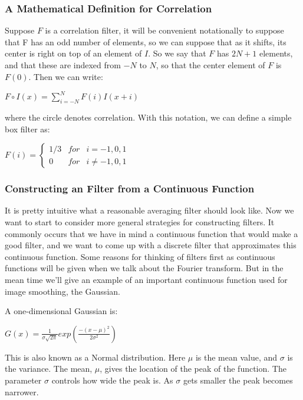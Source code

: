 \documentclass{report}
\begin{document}
\subsubsection{A Mathematical Definition for Correlation}
Suppose $F$ is a correlation filter, it will be convenient notationally to suppose that F has an odd number of elements, so we can suppose that as it shifts, its center is right on top of an element of $I$. So we say that $F$ has $2N+1$ elements, and that these are indexed from $-N$ to $N$, so that the center element of $F$ is $F(0)$. Then we can write:\newline\newline
    \centerline{$F \circ I(x) = \sum_{i=-N}^N F(i)I(x+i)$}\newline\newline
where the circle denotes correlation. With this notation, we can define a simple box filter as:\newline\newline
    \centerline{$F(i) = \left\{\begin{matrix}
1/3 & for & i = -1,0,1 \\ 
0 & for & i \neq -1,0,1
\end{matrix}\right.$}

\subsubsection{Constructing an Filter from a Continuous Function}
It is pretty intuitive what a reasonable averaging filter should look like. Now we want to start to consider more general strategies for constructing filters. It commonly occurs that we have in mind a continuous function that would make a good filter, and we want to come up with a discrete filter that approximates this continuous function. Some reasons for thinking of filters first as continuous functions will be given when we talk about the Fourier transform. But in the mean time we'll give an example of an important continuous function used for image smoothing, the Gaussian.\newline

A one-dimensional Gaussian is:\newline
    \centerline{$G(x) = \frac{1}{\sigma \sqrt{2 \pi}} exp\left ( \frac{-(x - \mu)^2}{2\sigma^2} \right )$}\newline\newline
This is also known as a Normal distribution. Here $\mu$ is the mean value, and $\sigma$ is the variance.\newline
The mean, $\mu$, gives the location of the peak of the function. The parameter $\sigma$ controls how wide the peak is. As $\sigma$ gets smaller the peak becomes narrower.\newline
\end{document}
